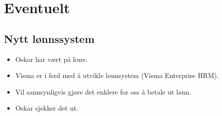 \documentclass{article}[12pt]
\begin{document}
\section{Eventuelt}
    \subsection{Nytt lønnssystem}
        \begin{itemize}
            \item Oskar har vært på kurs.
            \item Visma er i ferd med å utvikle lønnsystem
                  (Visma Enterprise HRM).
            \item Vil sannsynligvis gjøre det enklere for oss å betale
                  ut lønn.
            \item Oskar sjekker det ut.
        \end{itemize}
\end{document}
